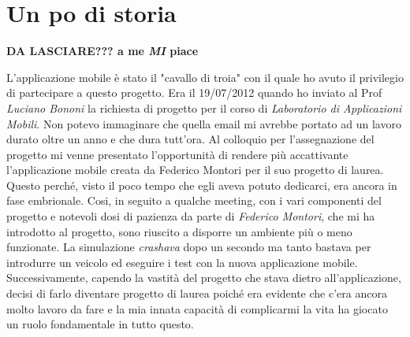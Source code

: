 %




\section{Un po di storia}\label{sec:unpodistoria}

\textbf{DA LASCIARE??? a me \emph{MI} piace}

L'applicazione mobile è stato il "cavallo di troia" con il quale ho avuto il privilegio di partecipare a questo progetto. Era il 19/07/2012 quando ho inviato al Prof \emph{Luciano Bononi} la richiesta di progetto per il corso di \emph{Laboratorio di Applicazioni Mobili}. Non potevo immaginare che quella email mi avrebbe portato ad un lavoro durato oltre un anno e che dura tutt'ora.
Al colloquio per l'assegnazione del progetto mi venne presentato l'opportunità di rendere più accattivante l'applicazione mobile creata da Federico Montori per il suo progetto di laurea. Questo perché, visto il poco tempo che egli aveva potuto dedicarci, era ancora in fase embrionale.
Cosi, in seguito a qualche meeting, con i vari componenti del progetto e notevoli dosi di pazienza da parte di \emph{Federico Montori}, che mi ha introdotto al progetto, sono riuscito a disporre un ambiente più o meno funzionate. La simulazione \emph{crashava} dopo un secondo ma tanto bastava per introdurre un veicolo ed eseguire i test con la nuova applicazione mobile.
Successivamente, capendo la vastità del progetto che stava dietro all'applicazione, decisi di farlo diventare progetto di laurea poiché era evidente che c'era ancora molto lavoro da fare e la mia innata capacità di complicarmi la vita ha giocato un ruolo fondamentale in tutto questo.

